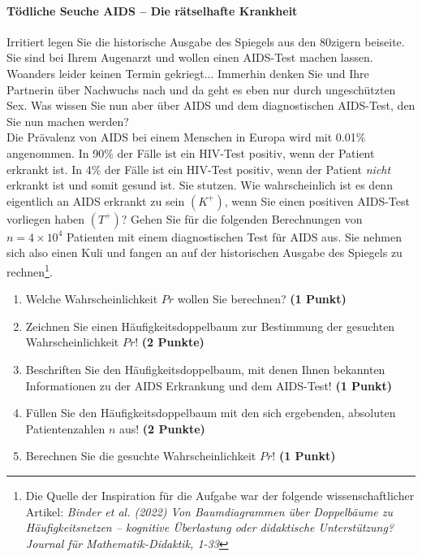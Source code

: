 \documentclass[a4paper, 9pt]{scrartcl}\usepackage[]{graphicx}\usepackage[]{xcolor}
\begin{document}
\paragraph{T{\"o}dliche Seuche AIDS -- Die r{\"a}tselhafte Krankheit}




Irritiert legen Sie die historische Ausgabe des Spiegels aus den 80zigern
beiseite. Sie sind bei Ihrem Augenarzt und wollen einen AIDS-Test machen
lassen. Woanders leider keinen Termin gekriegt... Immerhin denken Sie und
Ihre Partnerin {\"u}ber Nachwuchs nach und da geht es eben nur durch
ungesch{\"u}tzten Sex. Was wissen Sie nun aber {\"u}ber AIDS und dem diagnostischen
AIDS-Test, den Sie nun machen werden?\\

Die Pr{\"a}valenz von AIDS bei einem Menschen in Europa wird mit
0.01\% angenommen. In 90\% der F{\"a}lle ist ein
HIV-Test positiv, wenn der Patient erkrankt ist. In 4\%
der F{\"a}lle ist ein HIV-Test positiv, wenn der Patient \textit{nicht}
erkrankt ist und somit gesund ist. Sie stutzen. Wie wahrscheinlich ist es
denn eigentlich an AIDS erkrankt zu sein $(K^+)$, wenn Sie einen positiven
AIDS-Test vorliegen haben $(T^+)$? Gehen Sie f{\"u}r die folgenden Berechnungen
von $n = \ensuremath{4\times 10^{4}}$ Patienten mit einem diagnostischen Test f{\"u}r AIDS
aus. Sie nehmen sich also einen Kuli und fangen an auf der historischen
Ausgabe des Spiegels zu rechnen\footnote{Die Quelle der Inspiration f{\"u}r die
  Aufgabe war der folgende wissenschaftlicher Artikel: \textit{Binder et
    al. (2022) Von Baumdiagrammen {\"u}ber Doppelb{\"a}ume zu H{\"a}ufigkeitsnetzen --
    kognitive {\"U}berlastung oder didaktische Unterst{\"u}tzung? Journal f{\"u}r
    Mathematik-Didaktik, 1-33}}.

\begin{enumerate}
\item Welche Wahrscheinlichkeit $Pr$ wollen Sie berechnen? \textbf{(1 Punkt)}
\item Zeichnen Sie einen H{\"a}ufigkeitsdoppelbaum zur Bestimmung der gesuchten
  Wahrscheinlichkeit $Pr$! \textbf{(2 Punkte)} 
\item Beschriften Sie den H{\"a}ufigkeitsdoppelbaum, mit denen Ihnen bekannten
  Informationen zu der AIDS Erkrankung und dem AIDS-Test! \textbf{(1 Punkt)}
\item F{\"u}llen Sie den H{\"a}ufigkeitsdoppelbaum mit den sich ergebenden,
  absoluten Patientenzahlen $n$ aus! \textbf{(2 Punkte)}
\item Berechnen Sie die gesuchte Wahrscheinlichkeit $Pr$! \textbf{(1 Punkt)}
\end{enumerate}
\end{document}
